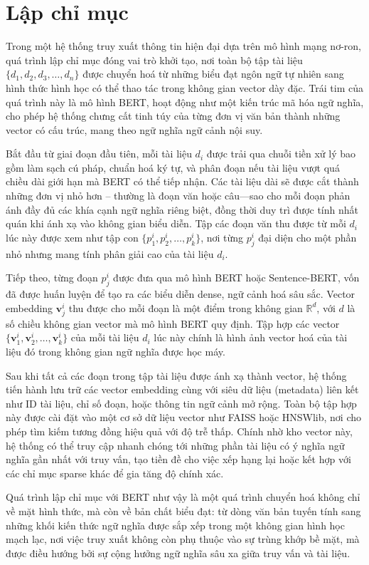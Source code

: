 \section{Lập chỉ mục}
Trong một hệ thống truy xuất thông tin hiện đại dựa trên mô hình mạng nơ-ron, quá trình lập chỉ mục đóng vai trò khởi tạo, nơi toàn bộ tập tài liệu \(\{d_1, d_2, d_3, \ldots, d_n\}\) được chuyển hoá từ những biểu đạt ngôn ngữ tự nhiên sang hình thức hình học có thể thao tác trong không gian vector dày đặc. Trái tim của quá trình này là mô hình BERT, hoạt động như một kiến trúc mã hóa ngữ nghĩa, cho phép hệ thống chưng cất tinh túy của từng đơn vị văn bản thành những vector có cấu trúc, mang theo ngữ nghĩa ngữ cảnh nội suy.

Bắt đầu từ giai đoạn đầu tiên, mỗi tài liệu \(d_i\) được trải qua chuỗi tiền xử lý bao gồm làm sạch cú pháp, chuẩn hoá ký tự, và phân đoạn nếu tài liệu vượt quá chiều dài giới hạn mà BERT có thể tiếp nhận. Các tài liệu dài sẽ được cắt thành những đơn vị nhỏ hơn -- thường là đoạn văn hoặc câu—sao cho mỗi đoạn phản ánh đầy đủ các khía cạnh ngữ nghĩa riêng biệt, đồng thời duy trì được tính nhất quán khi ánh xạ vào không gian biểu diễn. Tập các đoạn văn thu được từ mỗi \(d_i\) lúc này được xem như tập con \(\{p_1^i, p_2^i, \ldots, p_k^i\}\), nơi từng \(p_j^i\) đại diện cho một phần nhỏ nhưng mang tính phân giải cao của tài liệu \(d_i\).

Tiếp theo, từng đoạn \(p_j^i\) được đưa qua mô hình BERT hoặc Sentence-BERT, vốn đã được huấn luyện để tạo ra các biểu diễn dense, ngữ cảnh hoá sâu sắc. Vector embedding \(\mathbf{v}_{j}^{i}\) thu được cho mỗi đoạn là một điểm trong không gian \(\mathbb{R}^d\), với \(d\) là số chiều không gian vector mà mô hình BERT quy định. Tập hợp các vector \(\{\mathbf{v}_{1}^{i}, \mathbf{v}_{2}^{i}, \ldots, \mathbf{v}_{k}^{i}\}\) của mỗi tài liệu \(d_i\) lúc này chính là hình ảnh vector hoá của tài liệu đó trong không gian ngữ nghĩa được học máy.

Sau khi tất cả các đoạn trong tập tài liệu được ánh xạ thành vector, hệ thống tiến hành lưu trữ các vector embedding cùng với siêu dữ liệu (metadata) liên kết như ID tài liệu, chỉ số đoạn, hoặc thông tin ngữ cảnh mở rộng. Toàn bộ tập hợp này được cài đặt vào một cơ sở dữ liệu vector như FAISS hoặc HNSWlib, nơi cho phép tìm kiếm tương đồng hiệu quả với độ trễ thấp. Chính nhờ kho vector này, hệ thống có thể truy cập nhanh chóng tới những phần tài liệu có ý nghĩa ngữ nghĩa gần nhất với truy vấn, tạo tiền đề cho việc xếp hạng lại hoặc kết hợp với các chỉ mục sparse khác để gia tăng độ chính xác.

Quá trình lập chỉ mục với BERT như vậy là một quá trình chuyển hoá không chỉ về mặt hình thức, mà còn về bản chất biểu đạt: từ dòng văn bản tuyến tính sang những khối kiến thức ngữ nghĩa được sắp xếp trong một không gian hình học mạch lạc, nơi việc truy xuất không còn phụ thuộc vào sự trùng khớp bề mặt, mà được điều hướng bởi sự cộng hưởng ngữ nghĩa sâu xa giữa truy vấn và tài liệu.
